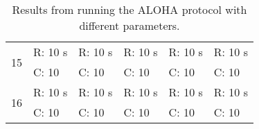 \begin{table}[H]
\begin{tabular}{|c|l||l||l||l||l|}
        \multirow{2}{*}{15}     & R: 10 s                          & R: 10 s                          & R: 10 s                        & R: 10 s                         & R: 10 s                        \\ \cline{2-6}
                               & C: 10                            & C: 10                            & C: 10                          & C: 10                           & C: 10                          \\ \hline\hline

        \multirow{2}{*}{16}     & R: 10 s                          & R: 10 s                          & R: 10 s                        & R: 10 s                         & R: 10 s                        \\ \cline{2-6}
                               & C: 10                            & C: 10                            & C: 10                          & C: 10                           & C: 10                          \\ \hline
    \end{tabular}
    \caption{Results from running the ALOHA protocol with different parameters.}
    \label{table:experiments:aloha-results}
\end{table}